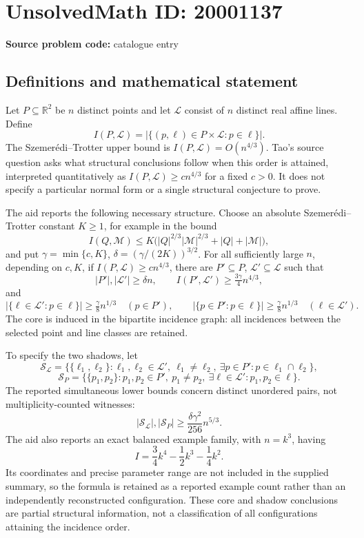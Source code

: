 \documentclass[11pt]{article}
\newcommand{\R}{\mathbb{R}}
\begin{document}
\section*{UnsolvedMath ID: 20001137}
\textbf{Source problem code:} catalogue entry
\subsection{Definitions and mathematical statement}
Let \(P\subseteq\R^2\) be \(n\) distinct points and let \(\mathcal L\) consist of \(n\) distinct real affine lines. Define
\[
 I(P,\mathcal L)=|\{(p,\ell)\in P\times\mathcal L:p\in\ell\}|.
\]
The Szemerédi--Trotter upper bound is \(I(P,\mathcal L)=O(n^{4/3})\). Tao's source question asks what structural conclusions follow when this order is attained, interpreted quantitatively as \(I(P,\mathcal L)\geq c n^{4/3}\) for a fixed \(c>0\). It does not specify a particular normal form or a single structural conjecture to prove.

The aid reports the following necessary structure. Choose an absolute Szemerédi--Trotter constant \(K\geq1\), for example in the bound
\[
 I(Q,\mathcal M)\leq K\bigl(|Q|^{2/3}|\mathcal M|^{2/3}+|Q|+|\mathcal M|\bigr),
\]
and put \(\gamma=\min\{c,K\}\), \(\delta=(\gamma/(2K))^{3/2}\). For all sufficiently large \(n\), depending on \(c,K\), if \(I(P,\mathcal L)\geq c n^{4/3}\), there are \(P'\subseteq P\), \(\mathcal L'\subseteq\mathcal L\) such that
\[
 |P'|,|\mathcal L'|\geq\delta n,\qquad
 I(P',\mathcal L')\geq\tfrac{3\gamma}{4}n^{4/3},
\]
and
\[
 |\{\ell\in\mathcal L':p\in\ell\}|\geq\tfrac\gamma8 n^{1/3}\quad(p\in P'),\qquad
 |\{p\in P':p\in\ell\}|\geq\tfrac\gamma8 n^{1/3}\quad(\ell\in\mathcal L').
\]
The core is induced in the bipartite incidence graph: all incidences between the selected point and line classes are retained.

To specify the two shadows, let
\[
 \mathcal S_{\mathcal L}=\{\{\ell_1,\ell_2\}:\ell_1,\ell_2\in\mathcal L',\ \ell_1\ne\ell_2,
 \ \exists p\in P':p\in\ell_1\cap\ell_2\},
\]
\[
 \mathcal S_P=\{\{p_1,p_2\}:p_1,p_2\in P',\ p_1\ne p_2,
 \ \exists\ell\in\mathcal L':p_1,p_2\in\ell\}.
\]
The reported simultaneous lower bounds concern distinct unordered pairs, not multiplicity-counted witnesses:
\[
 |\mathcal S_{\mathcal L}|,|\mathcal S_P|
 \geq\frac{\delta\gamma^2}{256}n^{5/3}.
\]
The aid also reports an exact balanced example family, with \(n=k^3\), having
\[
 I=\frac34k^4-\frac12k^3-\frac14k^2.
\]
Its coordinates and precise parameter range are not included in the supplied summary, so the formula is retained as a reported example count rather than an independently reconstructed configuration. These core and shadow conclusions are partial structural information, not a classification of all configurations attaining the incidence order.
\end{document}
